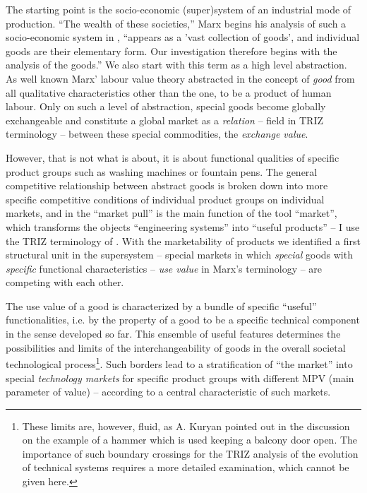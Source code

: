 \documentclass{llncs}
\begin{document}
The starting point is the socio-economic (super)system of an industrial mode
of production. ``The wealth of these societies,'' Marx begins his analysis of
such a socio-economic system in \cite{MEW23}, ``appears as a 'vast collection
of goods', and individual goods are their elementary form. Our investigation
therefore begins with the analysis of the goods.''  We also start with this
term as a high level abstraction. As well known Marx' labour value theory
abstracted in the concept of \emph{good} from all qualitative characteristics
other than the one, to be a product of human labour. Only on such a level of
abstraction, special goods become globally exchangeable and constitute a
global market as a \emph{relation} -- field in TRIZ terminology -- between
these special commodities, the \emph{exchange value}.

However, that is not what \cite{TESE2018} is about, it is about functional
qualities of specific product groups such as washing machines or fountain
pens. The general competitive relationship between abstract goods is broken
down into more specific competitive conditions of individual product groups on
individual markets, and in \cite{TESE2018} the ``market pull'' is the main
function of the tool ``market'', which transforms the objects ``engineering
systems'' into ``useful products'' -- I use the TRIZ terminology of \cite{TT}.
With the marketability of products we identified a first structural unit in
the supersystem -- special markets in which \emph{special} goods with
\emph{specific} functional characteristics -- \emph{use value} in Marx's
terminology -- are competing with each other.

The use value of a good is characterized by a bundle of specific ``useful''
functionalities, i.e. by the property of a good to be a specific technical
component in the sense developed so far.  This ensemble of useful features
determines the possibilities and limits of the interchangeability of goods in
the overall societal technological process\footnote{These limits are, however,
  fluid, as A. Kuryan pointed out in the discussion \cite{Graebe2019} on the
  example of a hammer which is used keeping a balcony door open. The
  importance of such boundary crossings for the TRIZ analysis of the evolution
  of technical systems requires a more detailed examination, which cannot be
  given here.}.  Such borders lead to a stratification of ``the market'' into
special \emph{technology markets} for specific product groups with different
MPV (main parameter of value) -- according to \cite{TESE2018} a central
characteristic of such markets.
\end{document}
